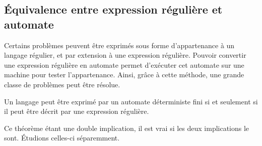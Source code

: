 
\subsection{Équivalence entre expression régulière et automate}\label{adf:eq}

Certains problèmes peuvent être exprimés sous forme d'appartenance à un langage régulier, et par extension à une expression régulière.
Pouvoir convertir une expression régulière en automate permet d'exécuter cet automate sur une machine pour tester l'appartenance. Ainsi, grâce à cette méthode, une grande classe de problèmes peut être résolue.


\begin{theorem}
	Un langage peut être exprimé par un automate déterministe fini si et seulement si il peut être décrit par une expression régulière.
\end{theorem}

Ce théorème étant une double implication, il est vrai si les deux implications le sont. Étudions celles-ci séparemment.


